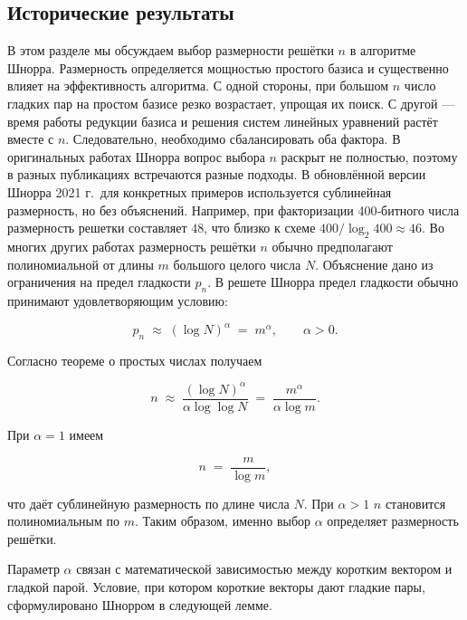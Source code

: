 
\subsection*{Исторические результаты}

В этом разделе мы обсуждаем выбор размерности решётки $n$ в алгоритме Шнорра.
Размерность определяется мощностью простого базиса и существенно влияет на
эффективность алгоритма. С одной стороны, при большом $n$ число гладких пар на
простом базисе резко возрастает, упрощая их поиск. С другой — время работы
редукции базиса и решения систем линейных уравнений растёт вместе с $n$.
Следовательно, необходимо сбалансировать оба фактора. В оригинальных работах
Шнорра \cite{cite_29,cite_30,cite_41} вопрос выбора $n$ раскрыт не полностью,
поэтому в разных публикациях встречаются разные подходы. В обновлённой версии
Шнорра 2021 г.\,\cite{cite_30} для конкретных примеров используется сублинейная
размерность, но без объяснений. Например, при факторизации 400‑битного числа
размерность решетки составляет $48$, что близко к схеме $400/\log_{2}400
\approx 46$. Во многих других работах размерность решётки $n$ обычно
предполагают полиномиальной от длины $m$ большого целого числа $N$. Объяснение
дано из ограничения на предел гладкости $p_{n}$. В решете Шнорра предел
гладкости обычно принимают удовлетворяющим условию:

\begin{equation}
    p_{n} \;\approx\; (\log N)^{\alpha} \;=\; m^{\alpha},
    \qquad \alpha>0 .
\end{equation}

\noindent Согласно теореме о простых числах получаем

\begin{equation}
    n \;\approx\; \frac{(\log N)^{\alpha}}{\alpha\log\log N}
    \;=\; \frac{m^{\alpha}}{\alpha\log m}.
\end{equation}

\noindent При $\alpha = 1$ имеем

\begin{equation}
    n \;=\; \frac{m}{\log m},
\end{equation}

\noindent что даёт сублинейную размерность по длине числа $N$. При $\alpha>1$
$n$ становится полиномиальным по $m$. Таким образом, именно выбор $\alpha$
определяет размерность решётки.

Параметр $\alpha$ связан с математической зависимостью между коротким вектором
и гладкой парой. Условие, при котором короткие векторы дают гладкие пары,
сформулировано Шнорром в следующей лемме.

